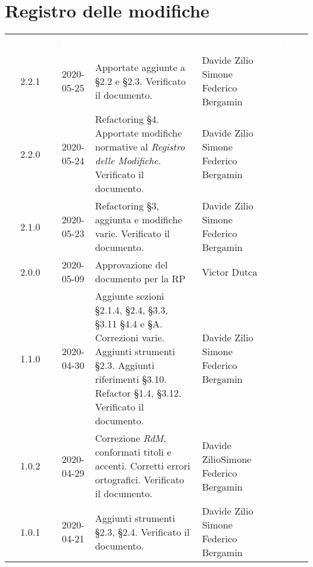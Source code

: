 \section*{Registro delle modifiche}
{
	\centering
	\begin{longtable}{ c c  C{4cm}  C{3.8cm}  C{3cm} }
		\textcolor{white}{\textbf{Versione}} & \textcolor{white}{\textbf{Data}} & \textcolor{white}{\textbf{Descrizione}} & \textcolor{white}{\textbf{Nominativo}} & \textcolor{white}{\textbf{Ruolo}}\\
		2.2.1 & 2020-05-25 & Apportate aggiunte a \S 2.2 e \S 2.3. Verificato il documento. & Davide Zilio \newline Simone Federico Bergamin & \adm{} \newline  \ver{} \\
		2.2.0 & 2020-05-24 & Refactoring \S 4. Apportate modifiche normative al \textit{Registro delle Modifiche}. Verificato il documento. & Davide Zilio \newline Simone Federico Bergamin & \adm{} \newline  \ver{} \\
	2.1.0 & 2020-05-23 & Refactoring \S 3, aggiunta e modifiche varie. Verificato il documento. & Davide Zilio \newline Simone Federico Bergamin & \adm{} \newline  \ver{} \\
	2.0.0 & 2020-05-09 & Approvazione del documento per la RP & Victor Dutca &\Res{}\\
	1.1.0 & 2020-04-30 & Aggiunte sezioni \S 2.1.4, \S 2.4, \S 3.3, \S 3.11 \S 4.4 e \S A. Correzioni varie. Aggiunti strumenti \S 2.3. Aggiunti riferimenti \S 3.10. Refactor \S 1.4, \S 3.12. Verificato il documento. & Davide Zilio \newline Simone Federico Bergamin&\adm{} \newline  \ver{}\\
	1.0.2 & 2020-04-29 & Correzione \textit{RdM}, conformati titoli e accenti. Corretti errori ortografici. Verificato il documento. & Davide Zilio\newline Simone Federico Bergamin &\adm{} \newline  \ver{}\\
	1.0.1 & 2020-04-21 & Aggiunti strumenti \S 2.3, \S 2.4. Verificato il documento. & Davide Zilio \newline Simone Federico Bergamin &\adm{} \newline  \ver{}\\	

\end{longtable}}
